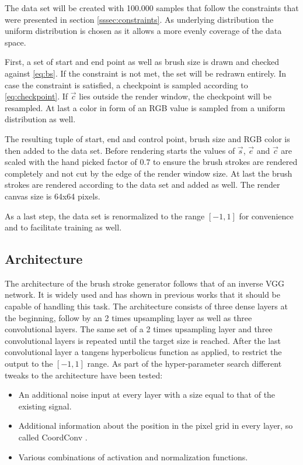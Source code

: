 The data set will be created with 100.000 samples that follow the constraints that
were presented in section \ref{sssec:constraints}.
As underlying distribution the uniform distribution is chosen as it allows a more
evenly coverage of the data space.

First, a set of start and end point as well as brush size is drawn and checked against
\eqref{eq:bs}.
If the constraint is not met, the set will be redrawn entirely.
In case the constraint is satisfied, a checkpoint is sampled according to \eqref{eq:checkpoint}.
If $\vec{c}$ lies outside the render window, the checkpoint will be resampled.
At last a color in form of an RGB value is sampled from a uniform distribution as well.

The resulting tuple of start, end and control point, brush size and RGB color is then
added to the data set.
Before rendering starts the values of $\vec{s}$, $\vec{e}$ and $\vec{c}$ are scaled
with the hand picked factor of $0.7$ to ensure the brush strokes are rendered completely
and not cut by the edge of the render window size.
At last the brush strokes are rendered according to the data set and added as well.
The render canvas size is 64x64 pixels.

As a last step, the data set is renormalized to the range $[-1, 1]$ for convenience
and to facilitate training as well.


\subsection{Architecture}
The architecture of the brush stroke generator follows that of an inverse VGG network.
It is widely used and has shown in previous works that it should be capable of handling
this task.
 The architecture consists of three dense layers at the beginning,
follow by an 2 times upsampling layer as well as three convolutional layers.
The same set of a 2 times upsampling layer and three convolutional layers is repeated
until the target size is reached.
After the last convolutional layer a tangens hyperbolicus function as applied, to
restrict the output to the $[-1, 1]$ range.
As part of the hyper-parameter search different tweaks to the architecture have been
tested:
\begin{itemize}
    \item An additional noise input at every layer with a size equal to that of the existing signal.
    \item Additional information about the position in the pixel grid in every layer, so called
        CoordConv \cite{coordconv}.
    \item Various combinations of activation and normalization functions.
\end{itemize}

